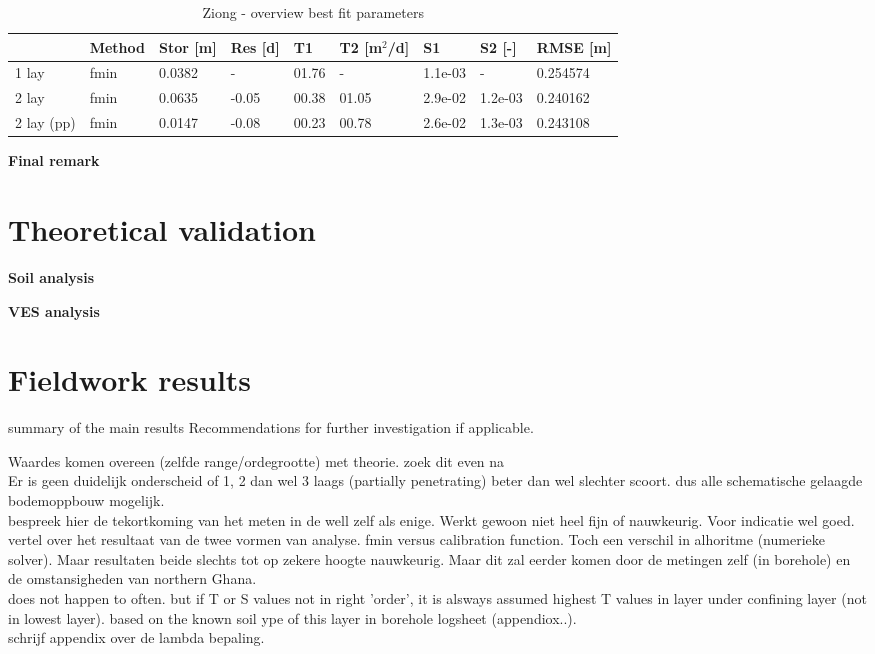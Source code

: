 \begin{table}[h!]
\small
\centering
\caption{Ziong - overview best fit parameters}
\label{tab:Ziong_table}
\begin{tabular}{l|l|l|l|ll|ll|l}
\hline 
\textbf{}       & \textbf{Method} & \textbf{Stor [m]} & \textbf{Res [d]} & \textbf{T1}  & \textbf{T2   [m$^2$/d]}  & \textbf{S1}  & \textbf{S2 [-]}  & \textbf{RMSE [m]} \\ \hline \hline
1 lay                     & fmin             & 0.0382        & -            & 01.76      & -          & 1.1e-03    & -          & 0.254574 \\
2 lay                     & fmin             & 0.0635        & -0.05        & 00.38      & 01.05      & 2.9e-02    & 1.2e-03    & 0.240162 \\
2 lay (pp)                & fmin             & 0.0147        & -0.08        & 00.23      & 00.78      & 2.6e-02    & 1.3e-03    & 0.243108 \\ \hline    
\end{tabular}
\end{table}

\textbf{Final remark}

\section{Theoretical validation}

\textbf{Soil analysis}

\textbf{VES analysis}


\section{Fieldwork results}
\label{section:fieldwork_results}

summary of the main results
Recommendations for further investigation if applicable. 

Waardes komen overeen (zelfde range/ordegrootte) met theorie. zoek dit even na \\

Er is geen duidelijk onderscheid of 1, 2 dan wel 3 laags (partially penetrating) beter dan wel slechter scoort. dus alle schematische gelaagde bodemoppbouw mogelijk. \\ 

bespreek hier de tekortkoming van het meten in de well zelf als enige. Werkt gewoon niet heel fijn of nauwkeurig. Voor indicatie wel goed. \\ 

vertel over het resultaat van de twee vormen van analyse. fmin versus calibration function. Toch een verschil in alhoritme (numerieke solver). Maar resultaten beide slechts tot op zekere hoogte nauwkeurig. Maar dit zal eerder komen door de metingen zelf (in borehole) en de omstansigheden van northern Ghana. \\ 

does not happen to often. but if T or S values not in right 'order', it is alsways assumed highest T values in layer under confining layer (not in lowest layer). based on the known soil ype of this layer in borehole logsheet (appendiox..). \\

schrijf appendix over de lambda bepaling. 